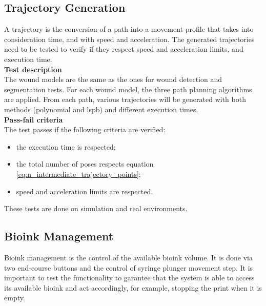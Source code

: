 
\subsection{Trajectory Generation}
\label{subsec:system_validation_tests_setup_trajectory_generation}

A trajectory is the conversion of a path into a movement profile that takes into consideration time, and with speed and acceleration. The generated trajectories need to be tested to verify if they respect speed and acceleration limits, and execution time.\\

\textbf{Test description}\\
The wound models are the same as the ones for wound detection and segmentation tests. For each wound model, the three path planning algorithms are applied. From each path, various trajectories will be generated with both methods (polynomial and \gls{lspb}) and different execution times. \\

\textbf{Pass-fail criteria}\\
The test passes if the following criteria are verified:
\begin{itemize}
    \item the execution time is respected;
    \item the total number of poses respects equation \ref{eq:n_intermediate_trajectory_points};
    \item speed and acceleration limits are respected.
\end{itemize}

These tests are done on simulation and real environments.


\subsection{Bioink Management}
\label{subsec:system_validation_tests_setup_bioink_management}

Bioink management is the control of the available bioink volume. It is done via two end-course buttons and the control of syringe plunger movement step. It is important to test the functionality to garantee that the system is able to access its available bioink and act accordingly, for example, stopping the print when it is empty.\\

